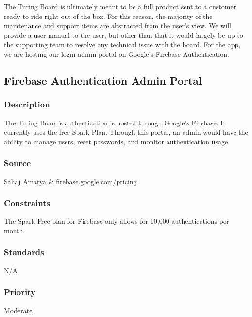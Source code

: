 The Turing Board is ultimately meant to be a full product sent to a customer ready to ride right out of the box. For this reason, the majority of the maintenance and support items are abstracted from the user's view. We will provide a user manual to the user, but other than that it would largely be up to the supporting team to resolve any technical issue with the board. For the app, we are hosting our login admin portal on Google's Firebase Authentication. 

\subsection{Firebase Authentication Admin Portal}
\subsubsection{Description}
The Turing Board's authentication is hosted through Google's Firebase. It currently uses the free Spark Plan. Through this portal, an admin would have the ability to manage users, reset passwords, and monitor authentication usage. 
\subsubsection{Source}
Sahaj Amatya \& firebase.google.com/pricing
\subsubsection{Constraints}
The Spark Free plan for Firebase only allows for 10,000 authentications per month.
\subsubsection{Standards}
N/A
\subsubsection{Priority}
Moderate
